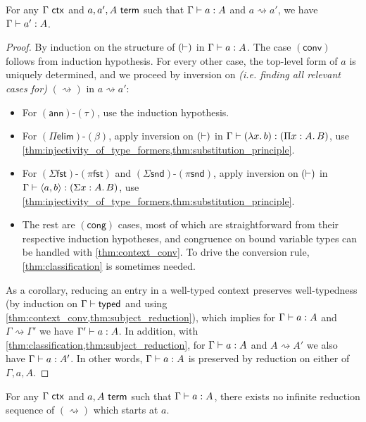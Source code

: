 \documentclass[twoside]{report}
\begin{document}
\begin{proposition}
    \label{thm:subject_reduction}
    For any $\Gamma \ \mathsf{ctx}$ and $a, a', A \ \mathsf{term}$ such that $\Gamma \vdash a : A$ and $a \rightsquigarrow a'$, we have $\Gamma \vdash a' : A$.
\end{proposition}

\begin{proof}
    By induction on the structure of $(\vdash)$ in $\Gamma \vdash a : A$. The case $(\mathsf{conv})$ follows from induction hypothesis. For every other case, the top-level form of $a$ is uniquely determined, and we proceed by inversion on \emph{(i.e. finding all relevant cases for)} $(\rightsquigarrow)$ in $a \rightsquigarrow a'$:
    \begin{itemize}[noitemsep]
        \item For $(\mathsf{ann})$-$(\tau)$, use the induction hypothesis.
        \item For $(\Pi\mathsf{elim})$-$(\mathsf{\beta})$, apply inversion on $(\vdash)$ in $\Gamma \vdash (\lambda{x}.\,{b}) : (\Pi{x} : {A}.\,{B})$, use \cref{thm:injectivity_of_type_formers,thm:substitution_principle}.
        \item For $(\Sigma\mathsf{fst})$-$(\mathsf{\pi{fst}})$ and $(\Sigma\mathsf{snd})$-$(\mathsf{\pi{snd}})$, apply inversion on $(\vdash)$ in $\Gamma \vdash \langle{a}, {b}\rangle : (\Sigma{x} : {A}.\,{B})$, use \cref{thm:injectivity_of_type_formers,thm:substitution_principle}.
        \item The rest are $(\mathsf{cong})$ cases, most of which are straightforward from their respective induction hypotheses, and congruence on bound variable types can be handled with \cref{thm:context_conv}. To drive the conversion rule, \cref{thm:classification} is sometimes needed.
    \end{itemize}
    As a corollary, reducing an entry in a well-typed context preserves well-typedness (by induction on $\Gamma \vdash \mathsf{typed}$ and using \cref{thm:context_conv,thm:subject_reduction}), which implies for $\Gamma \vdash a : A$ and $\Gamma \rightsquigarrow \Gamma'$ we have $\Gamma' \vdash a : A$. In addition, with \cref{thm:classification,thm:subject_reduction}, for $\Gamma \vdash a : A$ and $A \rightsquigarrow A'$ we also have $\Gamma \vdash a : A'$. In other words, $\Gamma \vdash a : A$ is preserved by reduction on either of $\Gamma, a, A$.
\end{proof}

\begin{proposition}
    \label{thm:red_termination}
    For any $\Gamma \ \mathsf{ctx}$ and $a,A \ \mathsf{term}$ such that $\Gamma \vdash a : A$, there exists no infinite reduction sequence of $(\rightsquigarrow)$ which starts at $a$.
\end{proposition}
\end{document}
